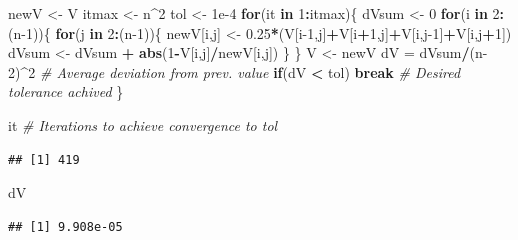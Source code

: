 \documentclass[
]{book}
\newenvironment{Shaded}{\begin{snugshade}}{\end{snugshade}}
\newcommand{\CommentTok}[1]{\textcolor[rgb]{0.56,0.35,0.01}{\textit{#1}}}
\newcommand{\ControlFlowTok}[1]{\textcolor[rgb]{0.13,0.29,0.53}{\textbf{#1}}}
\newcommand{\DecValTok}[1]{\textcolor[rgb]{0.00,0.00,0.81}{#1}}
\newcommand{\FloatTok}[1]{\textcolor[rgb]{0.00,0.00,0.81}{#1}}
\newcommand{\FunctionTok}[1]{\textcolor[rgb]{0.13,0.29,0.53}{\textbf{#1}}}
\newcommand{\NormalTok}[1]{#1}
\newcommand{\OtherTok}[1]{\textcolor[rgb]{0.56,0.35,0.01}{#1}}
\newcommand{\SpecialCharTok}[1]{\textcolor[rgb]{0.81,0.36,0.00}{\textbf{#1}}}
\theoremstyle{definition}
\theoremstyle{definition}
\theoremstyle{definition}
\theoremstyle{definition}
\theoremstyle{remark}
\begin{document}
\begin{Shaded}
\begin{Highlighting}[]
\NormalTok{newV  }\OtherTok{\textless{}{-}}\NormalTok{ V}
\NormalTok{itmax }\OtherTok{\textless{}{-}}\NormalTok{ n}\SpecialCharTok{\^{}}\DecValTok{2}
\NormalTok{tol   }\OtherTok{\textless{}{-}} \FloatTok{1e{-}4}
\ControlFlowTok{for}\NormalTok{(it }\ControlFlowTok{in} \DecValTok{1}\SpecialCharTok{:}\NormalTok{itmax)\{}
\NormalTok{  dVsum }\OtherTok{\textless{}{-}} \DecValTok{0}
  \ControlFlowTok{for}\NormalTok{(i }\ControlFlowTok{in} \DecValTok{2}\SpecialCharTok{:}\NormalTok{(n}\DecValTok{{-}1}\NormalTok{))\{}
    \ControlFlowTok{for}\NormalTok{(j }\ControlFlowTok{in} \DecValTok{2}\SpecialCharTok{:}\NormalTok{(n}\DecValTok{{-}1}\NormalTok{))\{}
\NormalTok{      newV[i,j] }\OtherTok{\textless{}{-}} \FloatTok{0.25}\SpecialCharTok{*}\NormalTok{(V[i}\DecValTok{{-}1}\NormalTok{,j]}\SpecialCharTok{+}\NormalTok{V[i}\SpecialCharTok{+}\DecValTok{1}\NormalTok{,j]}\SpecialCharTok{+}\NormalTok{V[i,j}\DecValTok{{-}1}\NormalTok{]}\SpecialCharTok{+}\NormalTok{V[i,j}\SpecialCharTok{+}\DecValTok{1}\NormalTok{])}
\NormalTok{      dVsum }\OtherTok{\textless{}{-}}\NormalTok{ dVsum }\SpecialCharTok{+} \FunctionTok{abs}\NormalTok{(}\DecValTok{1}\SpecialCharTok{{-}}\NormalTok{V[i,j]}\SpecialCharTok{/}\NormalTok{newV[i,j])}
\NormalTok{    \}}
\NormalTok{  \}}
\NormalTok{  V }\OtherTok{\textless{}{-}}\NormalTok{ newV}
\NormalTok{  dV }\OtherTok{=}\NormalTok{ dVsum}\SpecialCharTok{/}\NormalTok{(n}\DecValTok{{-}2}\NormalTok{)}\SpecialCharTok{\^{}}\DecValTok{2} \CommentTok{\# Average deviation from prev. value}
  \ControlFlowTok{if}\NormalTok{(dV }\SpecialCharTok{\textless{}}\NormalTok{ tol) }\ControlFlowTok{break} \CommentTok{\# Desired tolerance achived}
\NormalTok{\}}

\NormalTok{it }\CommentTok{\# Iterations to achieve convergence to tol}
\end{Highlighting}
\end{Shaded}

\begin{verbatim}
## [1] 419
\end{verbatim}

\begin{Shaded}
\begin{Highlighting}[]
\NormalTok{dV}
\end{Highlighting}
\end{Shaded}

\begin{verbatim}
## [1] 9.908e-05
\end{verbatim}
\end{document}

